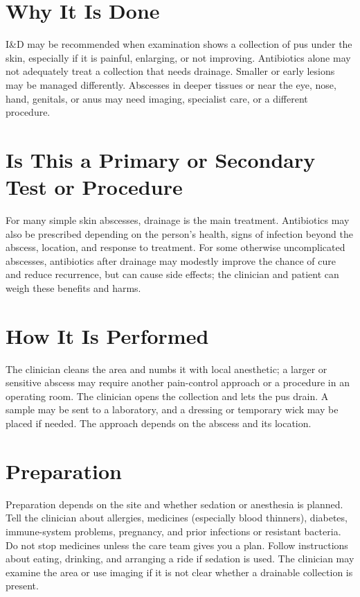 \section*{Why It Is Done}
I\&D may be recommended when examination shows a collection of pus under the skin, especially if it is painful, enlarging, or not improving. Antibiotics alone may not adequately treat a collection that needs drainage. Smaller or early lesions may be managed differently. Abscesses in deeper tissues or near the eye, nose, hand, genitals, or anus may need imaging, specialist care, or a different procedure.

\section*{Is This a Primary or Secondary Test or Procedure}
For many simple skin abscesses, drainage is the main treatment. Antibiotics may also be prescribed depending on the person's health, signs of infection beyond the abscess, location, and response to treatment. For some otherwise uncomplicated abscesses, antibiotics after drainage may modestly improve the chance of cure and reduce recurrence, but can cause side effects; the clinician and patient can weigh these benefits and harms.

\section*{How It Is Performed}
The clinician cleans the area and numbs it with local anesthetic; a larger or sensitive abscess may require another pain-control approach or a procedure in an operating room. The clinician opens the collection and lets the pus drain. A sample may be sent to a laboratory, and a dressing or temporary wick may be placed if needed. The approach depends on the abscess and its location.

\section*{Preparation}
Preparation depends on the site and whether sedation or anesthesia is planned. Tell the clinician about allergies, medicines (especially blood thinners), diabetes, immune-system problems, pregnancy, and prior infections or resistant bacteria. Do not stop medicines unless the care team gives you a plan. Follow instructions about eating, drinking, and arranging a ride if sedation is used. The clinician may examine the area or use imaging if it is not clear whether a drainable collection is present.

